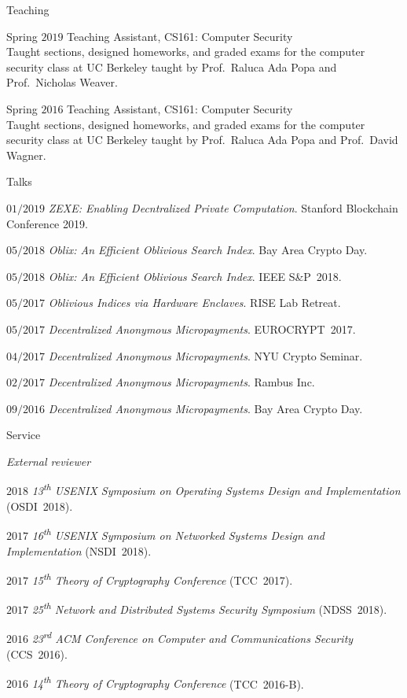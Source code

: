 \documentclass[11pt]{article}
\begin{document}
\begin{cv}{\vspace{-5em}}
  \begin{cvlist}{Teaching}
  \item[Spring $2019$] Teaching Assistant, \textsc{CS161}: Computer Security\\
    {\small
    Taught sections, designed homeworks, and graded exams for the computer security class at UC Berkeley taught by Prof.~Raluca Ada Popa and Prof.~Nicholas Weaver.}
  \item[Spring $2016$] Teaching Assistant, \textsc{CS161}: Computer Security\\
    {\small
    Taught sections, designed homeworks, and graded exams for the computer security class at UC Berkeley taught by Prof.~Raluca Ada Popa and Prof.~David Wagner.}
  \end{cvlist}
  \begin{cvlist}{Talks}
    \small
    \item[\small$01/2019$] \emph{ZEXE: Enabling Decntralized Private Computation}. Stanford Blockchain Conference 2019.
    \item[\small$05/2018$] \emph{Oblix: An Efficient Oblivious Search Index}. Bay Area Crypto Day.
    \item[\small$05/2018$] \emph{Oblix: An Efficient Oblivious Search Index}. IEEE S\&P~2018.
    \item[\small$05/2017$] \emph{Oblivious Indices via Hardware Enclaves}. RISE Lab Retreat.
    \item[\small$05/2017$] \emph{Decentralized Anonymous Micropayments}. EUROCRYPT~2017.
    \item[\small$04/2017$] \emph{Decentralized Anonymous Micropayments}. NYU Crypto Seminar.
    \item[\small$02/2017$] \emph{Decentralized Anonymous Micropayments}. Rambus Inc.
    \item[\small$09/2016$] \emph{Decentralized Anonymous Micropayments}. Bay Area Crypto Day.
  \end{cvlist}
  \begin{cvlist}{Service}
    \small
    \item[\emph{External reviewer}]
    \item[\small $2018$] \emph{13\textsuperscript{th} USENIX Symposium on Operating Systems Design and Implementation} (OSDI~2018).
    \item[\small $2017$] \emph{16\textsuperscript{th} USENIX Symposium on Networked Systems Design and Implementation} (NSDI~2018).
    \item[\small $2017$] \emph{15\textsuperscript{th} Theory of Cryptography Conference} (TCC~2017).
    \item[\small $2017$] \emph{25\textsuperscript{th} Network and Distributed Systems Security Symposium} (NDSS~2018).
    \item[\small $2016$] \emph{23\textsuperscript{rd} ACM Conference on Computer and Communications Security} (CCS~2016).
    \item[\small $2016$] \emph{14\textsuperscript{th} Theory of Cryptography Conference} (TCC~2016-B).
  \end{cvlist}
\end{cv}
\end{document}
